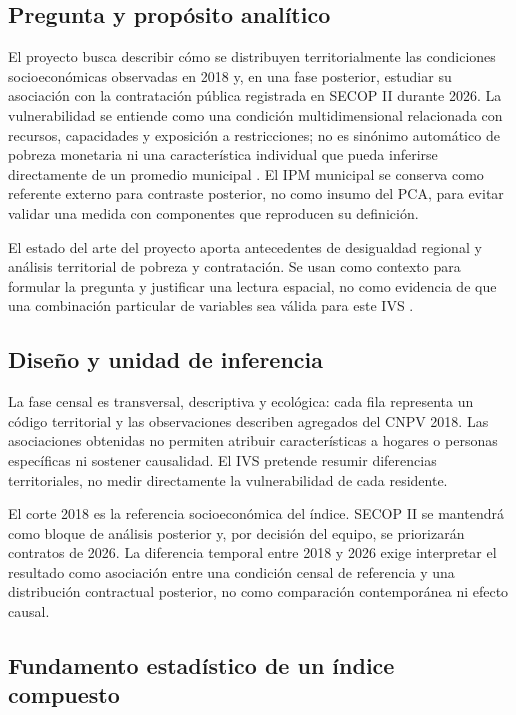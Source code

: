 \subsection{Pregunta y propósito analítico}

El proyecto busca describir cómo se distribuyen territorialmente las condiciones socioeconómicas observadas en 2018 y, en una fase posterior, estudiar su asociación con la contratación pública registrada en SECOP II durante 2026. La vulnerabilidad se entiende como una condición multidimensional relacionada con recursos, capacidades y exposición a restricciones; no es sinónimo automático de pobreza monetaria ni una característica individual que pueda inferirse directamente de un promedio municipal \citep{sen1999development,kaztman1999activos,pizarro2001vulnerabilidad}. El IPM municipal se conserva como referente externo para contraste posterior, no como insumo del PCA, para evitar validar una medida con componentes que reproducen su definición.

El estado del arte del proyecto aporta antecedentes de desigualdad regional y análisis territorial de pobreza y contratación. Se usan como contexto para formular la pregunta y justificar una lectura espacial, no como evidencia de que una combinación particular de variables sea válida para este IVS \citep{bonet2006desequilibrios,monsalvo2025ipm}.

\subsection{Diseño y unidad de inferencia}

La fase censal es transversal, descriptiva y ecológica: cada fila representa un código territorial y las observaciones describen agregados del CNPV 2018. Las asociaciones obtenidas no permiten atribuir características a hogares o personas específicas ni sostener causalidad. El IVS pretende resumir diferencias territoriales, no medir directamente la vulnerabilidad de cada residente.

El corte 2018 es la referencia socioeconómica del índice. SECOP II se mantendrá como bloque de análisis posterior y, por decisión del equipo, se priorizarán contratos de 2026. La diferencia temporal entre 2018 y 2026 exige interpretar el resultado como asociación entre una condición censal de referencia y una distribución contractual posterior, no como comparación contemporánea ni efecto causal.

\subsection{Fundamento estadístico de un índice compuesto}

